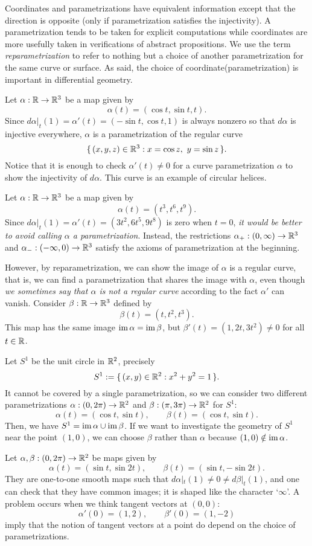 \documentclass{../exp}
\def\a{\alpha}
\begin{document}
Coordinates and parametrizations have equivalent information except that the direction is opposite (only if parametrization satisfies the injectivity).
A parametrization tends to be taken for explicit computations while coordinates are more usefully taken in verifications of abstract propositions.
We use the term \emph{reparametrization} to refer to nothing but a choice of another parametrization for the same curve or surface.
As said, the choice of coordinate(parametrization) is important in differential geometry.

\begin{exs}
\item
Let $\a:\R\to\R^3$ be a map given by
\[\a(t)=(\cos t,\sin t, t).\]
Since $d\a|_t(1)=\a'(t)=(-\sin t,\cos t,1)$ is always nonzero so that $d\a$ is injective everywhere, $\a$ is a parametrization of the regular curve
\[\{\,(x,y,z)\in\mathbb{R}^3:x=\cos z,\ y=\sin z\,\}.\]
Notice that it is enough to check $\a'(t)\ne0$ for a curve parametrization $\a$ to show the injectivity of $d\a$.
This curve is an example of circular helices.

\item
Let $\a:\R\to\R^3$ be a map given by
\[\a(t)=(t^3,t^6,t^9).\]
Since $d\a|_t(1)=\a'(t)=(3t^2,6t^5,9t^8)$ is zero when $t=0$, \emph{it would be better to avoid calling $\a$ a parametrization}.
Instead, the restrictions $\a_+:(0,\infty)\to\R^3$ and $\a_-:(-\infty,0)\to\R^3$ satisfy the axioms of parametrization at the beginning.

However, by reparametrization, we can show the image of $\a$ is a regular curve, that is, we can find a parametrization that shares the image with $\a$, even though \emph{we sometimes say that $\a$ is not a regular curve} according to the fact $\a'$ can vanish.
Consider $\beta:\R\to\R^3$ defined by
\[\beta(t)=(t,t^2,t^3).\]
This map has the same image $\im\a=\im\beta$, but $\beta'(t)=(1,2t,3t^2)\ne0$ for all $t\in\mathbb{R}$.

\item
Let $S^1$ be the unit circle in $\mathbb{R}^2$, precisely
\[S^1:=\{\,(x,y)\in\mathbb{R}^2:x^2+y^2=1\,\}.\]
It cannot be covered by a single parametrization, so we can consider two different parametrizations $\a:(0,2\pi)\to\R^2$ and $\beta:(\pi,3\pi)\to\R^2$ for $S^1$:
\[\alpha(t)=(\cos t,\sin t),\qquad\beta(t)=(\cos t,\sin t).\]
Then, we have $S^1=\im\a\cup\im\beta$.
If we want to investigate the geometry of $S^1$ near the point $(1,0)$, we can choose $\beta$ rather than $\a$ because $(1,0)\notin\im\a$.

\item
Let $\a,\beta:(0,2\pi)\to\R^2$ be maps given by
\[\a(t)=(\sin t,\sin2t),\qquad\beta(t)=(\sin t,-\sin2t).\]
They are one-to-one smooth maps such that $d\a|_t(1)\ne0\ne d\beta|_t(1)$, and one can check that they have common images; it is shaped like the character `$\infty$'.
A problem occurs when we think tangent vectors at $(0,0)$:
\[\a'(0)=(1,2),\qquad\beta'(0)=(1,-2)\]
imply that the notion of tangent vectors at a point do depend on the choice of parametrizations.


\end{exs}
\end{document}
